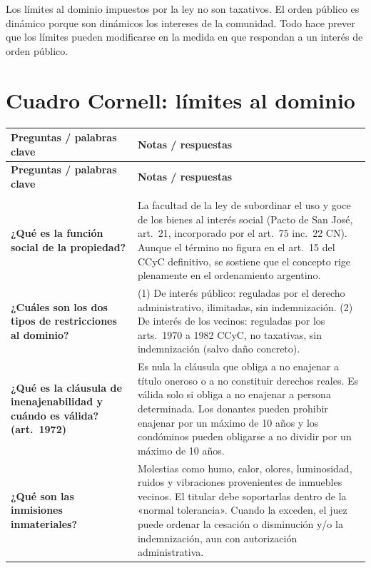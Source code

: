 \documentclass[12pt,oneside]{book}
\begin{document}
Los límites al dominio impuestos por la ley no son taxativos. El orden público es dinámico porque son dinámicos los intereses de la comunidad. Todo hace prever que los límites pueden modificarse en la medida en que respondan a un interés de orden público.

\section{Cuadro Cornell: límites al dominio}

\begin{longtable}{
    >{\raggedright\arraybackslash}p{}
    >{\raggedright\arraybackslash}p{}
}
\toprule
\textbf{Preguntas / palabras clave} & \textbf{Notas / respuestas} \\
\midrule
\endfirsthead
\toprule
\textbf{Preguntas / palabras clave} & \textbf{Notas / respuestas} \\
\midrule
\endhead
\midrule
\multicolumn{2}{r}{\small\itshape continúa en la página siguiente} \\
\endfoot
\bottomrule
\endlastfoot

\textbf{¿Qué es la función social de la propiedad?} &
La facultad de la ley de subordinar el uso y goce de los bienes al interés social (Pacto de San José, art.~21, incorporado por el art.~75 inc.~22 CN). Aunque el término no figura en el art.~15 del CCyC definitivo, se sostiene que el concepto rige plenamente en el ordenamiento argentino. \\

\textbf{¿Cuáles son los dos tipos de restricciones al dominio?} &
(1) De interés público: reguladas por el derecho administrativo, ilimitadas, sin indemnización. (2) De interés de los vecinos: reguladas por los arts.~1970 a 1982 CCyC, no taxativas, sin indemnización (salvo daño concreto). \\

\textbf{¿Qué es la cláusula de inenajenabilidad y cuándo es válida? (art.~1972)} &
Es nula la cláusula que obliga a no enajenar a título oneroso o a no constituir derechos reales. Es válida solo si obliga a no enajenar a persona determinada. Los donantes pueden prohibir enajenar por un máximo de 10 años y los condóminos pueden obligarse a no dividir por un máximo de 10 años. \\

\textbf{¿Qué son las inmisiones inmateriales?} &
Molestias como humo, calor, olores, luminosidad, ruidos y vibraciones provenientes de inmuebles vecinos. El titular debe soportarlas dentro de la «normal tolerancia». Cuando la exceden, el juez puede ordenar la cesación o disminución y/o la indemnización, aun con autorización administrativa. \\


\end{longtable}
\end{document}
